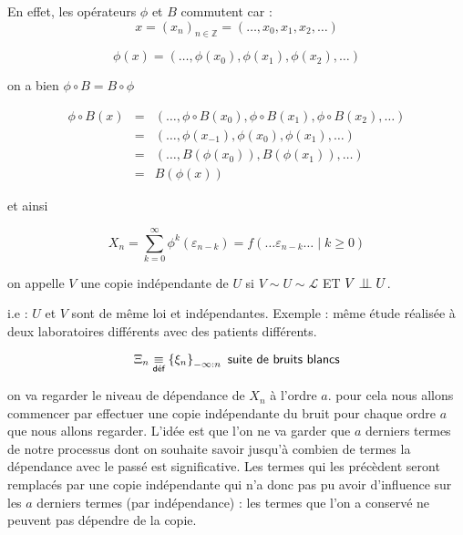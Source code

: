 En effet, les opérateurs $\phi$ et $B$ commutent car : 
$$x = (x_n)_{n \in \mathds Z} = (\dots , x_0, x_1, x_2, \dots)$$

$$\phi(x) = (\dots , \phi(x_0), \phi(x_1), \phi(x_2), \dots)$$

on a bien $\phi \circ B = B \circ \phi$

\begin{align*}
    \phi \circ B(x) &=& (\dots , \phi \circ B(x_0), \phi \circ B(x_1), \phi \circ B(x_2), \dots) 
    \\
    &=& (\dots, \phi(x_{-1}), \phi(x_0), \phi(x_1), \dots)
    \\
    &=& (\dots, B\left(\phi(x_0)\right) , B(\phi(x_1)),\dots)
    \\
    &=& B\left( \phi(x) \right)
\end{align*}


et ainsi 

$$X_n = \sum\limits_{k=0}^\infty \phi^k( \varepsilon_{n-k} ) = f( \dots \varepsilon_{n-k} \dots \; | \; k \geq 0)$$


\begin{definition}
    on appelle $V$ une copie indépendante de $U$ si $V \sim U \sim \mathcal L$ ET $V \indep U$.

    i.e : $U$ et $V$ sont de même loi et indépendantes. Exemple : même étude réalisée à deux laboratoires différents avec des patients différents.
\end{definition}

$$\Xi_n \isdef \left\{ \xi_n\right\}_{-\infty : n} \textsf{ suite de bruits blancs}$$

on va regarder le niveau de dépendance de $X_n$ à l'ordre $a$. pour cela nous allons commencer par effectuer une copie indépendante du bruit pour chaque ordre $a$ que nous allons regarder. L'idée est que l'on ne va garder que $a$ derniers termes de notre processus dont on souhaite savoir jusqu'à combien de termes la dépendance avec le passé est significative. Les termes qui les précèdent seront remplacés par une copie indépendante qui n'a donc pas pu avoir d'influence sur les $a$ derniers termes (par indépendance) : les termes que l'on a conservé ne peuvent pas dépendre de la copie.


